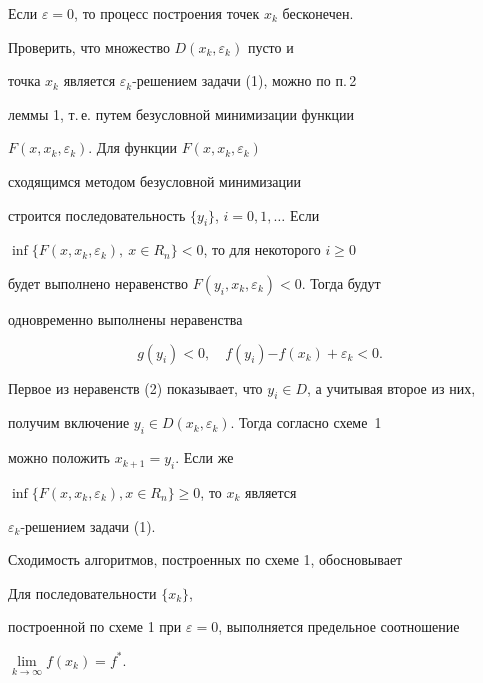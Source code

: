 \begin{note}


Если $\varepsilon=0$, то процесс построения точек $x_k$ бесконечен.


\end{note}





\begin{note}


Проверить, что множество $D(x_k,\varepsilon_k)$ пусто и


точка $x_k$ является $\varepsilon_k$-решением задачи (1), можно по п.\,2


леммы 1, т.\,е. путем безусловной минимизации функции


$F(x,x_k,\varepsilon_k)$. Для функции $F(x,x_k,\varepsilon_k)$


сходящимся методом безусловной минимизации


строится последовательность $\{y_i\}$, $i=0,1,\dotsc$ Если


$\inf\{F(x,x_k,\varepsilon_k),\ x\in R_n\}<0$, то для некоторого $i\ge0$


будет выполнено неравенство $F(y_i,x_k,\varepsilon_k)<0$. Тогда будут


одновременно выполнены неравенства


\begin{equation}


g(y_i)<0,\quad f(y_i){-f(x_k)}+\varepsilon_k<0.


\end{equation}


Первое из неравенств (2) показывает, что $y_i\in D$, а учитывая второе из них,


получим включение $y_i\in D(x_k,\varepsilon_k)$. Тогда согласно схеме~1


можно положить $x_{k+1}=y_i$. Если же


$\inf\{F(x,x_k,\varepsilon_k),x\in R_n\}\ge0$, то $x_k$ является


$\varepsilon_k$-решением задачи (1).


\end{note}





Сходимость алгоритмов, построенных по схеме 1, обосновывает





\begin{thm}


Для последовательности $\{x_k\}$,


построенной по схеме 1 при $\varepsilon=0$, выполняется предельное соотношение


$\lim\limits_{k\to\infty} f(x_k)=f^*$.


\end{thm}






